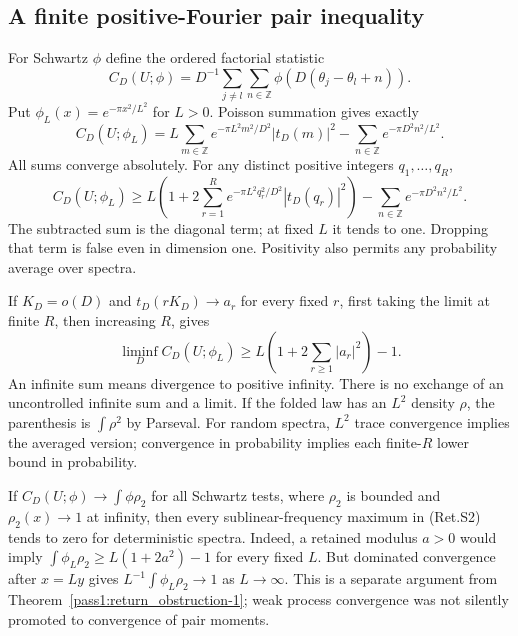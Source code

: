 \hypertarget{a-finite-positive-fourier-pair-inequality}{%
\subsection{A finite positive-Fourier pair inequality}\label{a-finite-positive-fourier-pair-inequality}}

For Schwartz \(\phi\) define the ordered factorial statistic
\[
 C_D(U;\phi)=D^{-1}\sum_{j\ne l}\sum_{n\in\mathbb Z}
                      \phi(D(\theta_j-\theta_l+n)).              \tag{Ret.S6}
\]
Put \(\phi_L(x)=e^{-\pi x^2/L^2}\) for \(L>0\). Poisson summation gives exactly
\[
 C_D(U;\phi_L)=L\sum_{m\in\mathbb Z}e^{-\pi L^2m^2/D^2}|t_D(m)|^2
                         -\sum_{n\in\mathbb Z}e^{-\pi D^2n^2/L^2}.
                                                                  \tag{Ret.S7}
\]
All sums converge absolutely. For any distinct positive integers \(q_1,\ldots,q_R\),
\[
 C_D(U;\phi_L)\ge
 L\left(1+2\sum_{r=1}^R e^{-\pi L^2q_r^2/D^2}|t_D(q_r)|^2\right)
                         -\sum_{n\in\mathbb Z}e^{-\pi D^2n^2/L^2}.
                                                                  \tag{Ret.S8}
\]
The subtracted sum is the diagonal term; at fixed \(L\) it tends to one.
Dropping that term is false even in dimension one. Positivity also permits
any probability average over spectra.

If \(K_D=o(D)\) and \(t_D(rK_D)\to a_r\) for every fixed \(r\), first taking the
limit at finite \(R\), then increasing \(R\), gives
\[
 \liminf_D C_D(U;\phi_L)\ge
                   L\left(1+2\sum_{r\ge1}|a_r|^2\right)-1.       \tag{Ret.S9}
\]
An infinite sum means divergence to positive infinity. There is no exchange
of an uncontrolled infinite sum and a limit. If the folded law has an \(L^2\)
density \(\rho\), the parenthesis is \(\int\rho^2\) by Parseval.
For random spectra, \(L^2\) trace convergence implies the averaged version;
convergence in probability implies each finite-\(R\) lower bound in probability.

\begin{corollary}\label{pass1:return_obstruction-3} If \(C_D(U;\phi)\to\int\phi\rho_2\) for all Schwartz tests,
where \(\rho_2\) is bounded and \(\rho_2(x)\to1\) at infinity, then every
sublinear-frequency maximum in (Ret.S2) tends to zero for deterministic spectra.
Indeed, a retained modulus \(a>0\) would imply
\(\int\phi_L\rho_2\ge L(1+2a^2)-1\) for every fixed \(L\). But dominated
convergence after \(x=Ly\) gives \(L^{-1}\int\phi_L\rho_2\to1\) as \(L\to\infty\).
This is a separate argument from Theorem~\ref{pass1:return_obstruction-1}; weak process convergence was not
silently promoted to convergence of pair moments.
\end{corollary}

